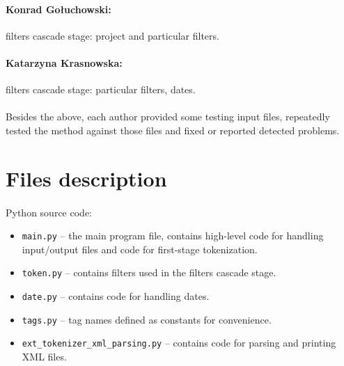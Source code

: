 \documentclass[oneside,12pt]{article}
\begin{document}
\paragraph{Konrad Gołuchowski:} filters cascade stage: project and particular filters.

\paragraph{Katarzyna Krasnowska:} filters cascade stage: particular filters, dates.

\paragraph{}
Besides the above, each author provided some testing input files, repeatedly tested the method against those files and fixed or reported detected problems. 

\section{Files description}

\paragraph{}
Python source code:
\begin{itemize}
    \item \texttt{main.py} -- the main program file, contains high-level code for handling input/output files and code for first-stage tokenization.
    
    \item \texttt{token.py} -- contains filters used in the filters cascade stage.
    
    \item \texttt{date.py} -- contains code for handling dates.
    
    \item \texttt{tags.py} -- tag names defined as constants for convenience.
    
    \item \texttt{ext\_tokenizer\_xml\_parsing.py} -- contains code for parsing and printing XML files.
\end{itemize}
\end{document}
